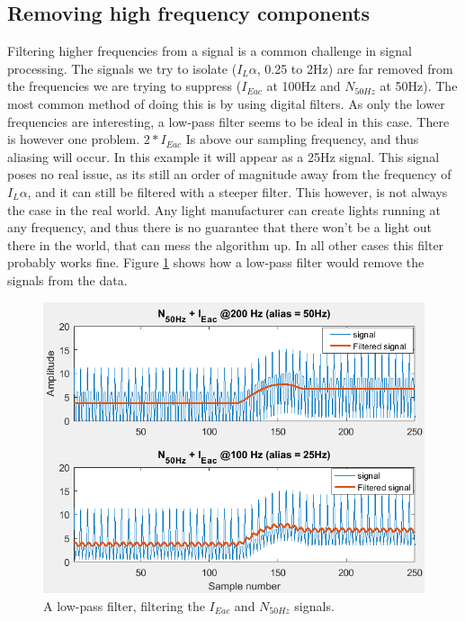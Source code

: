 \subsection{Removing high frequency components}
\label{subsec:removeing_AC}
Filtering higher frequencies from a signal is a common challenge in signal processing. The signals we try to isolate ($I_{L}\alpha$, 0.25 to 2Hz) are far removed from the frequencies we are trying to suppress ($I_{Eac}$ at 100Hz and $N_{50Hz}$ at 50Hz). The most common method of doing this is by using digital filters. As only the lower frequencies are interesting, a low-pass filter seems to be ideal in this case. There is however one problem. $2 * I_{Eac}$ Is above our sampling frequency, and thus aliasing will occur. In this example it will appear as a 25Hz signal. This signal poses no real issue, as its still an order of magnitude away from the frequency of $ I_{L} \alpha$, and it can still be filtered with a steeper filter. This however, is not always the case in the real world. Any light manufacturer can create lights running at any frequency, and thus there is no guarantee that there won't be a light out there in the world, that can mess the algorithm up. In all other cases this filter probably works fine. Figure \ref{fig:FilterVSAllias} shows how a low-pass filter would remove the signals from the data.

\begin{figure}
	\includegraphics[width=\textwidth]{pics/FirFilter_vs_allias.png}
	\caption{A low-pass filter, filtering the $I_{Eac}$ and $N_{50Hz}$ signals.}
	\label{fig:FilterVSAllias}
\end{figure}

